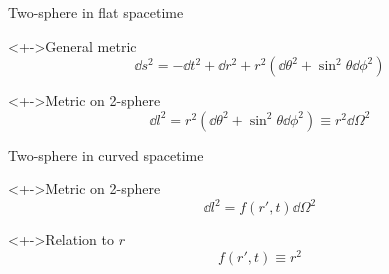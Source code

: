 \documentclass{beamer}
\let\svthefootnote\thefootnote
\newcommand\blankfootnote[1]{%
  \let\thefootnote\relax\footnotetext{#1}%
  \let\thefootnote\svthefootnote%
}
\begin{document}
\begin{frame}{Two-sphere in flat spacetime}

\begin{block}<+->{General metric}
  \begin{displaymath}
    \dd{s}^2 =
   -\dd{t}^2 +
    \dd{r}^2 +
    r^2 (\dd\theta^2 + \sin^2\theta \dd\phi^2)
  \end{displaymath}
\end{block}

\begin{block}<+->{Metric on 2-sphere}
  \begin{displaymath}
    \dd{l}^2 =
    r^2 (\dd\theta^2 + \sin^2\theta \dd\phi^2) \equiv
    r^2 \dd\Omega^2
  \end{displaymath}
\end{block}

\blankfootnote{\textcite[p. 256]{Schutz}}



\end{frame}


\begin{frame}{Two-sphere in curved spacetime}

\begin{block}<+->{Metric on 2-sphere}
  \begin{displaymath}
    \dd{l}^2 =
    f(r', t) \dd\Omega^2
  \end{displaymath}
\end{block}

\begin{block}<+->{Relation to $r$}
  \begin{displaymath}
    f(r', t) \equiv r^2
  \end{displaymath}
\end{block}

\blankfootnote{\textcite[pp. 256--257]{Schutz}}



\end{frame}
\end{document}
